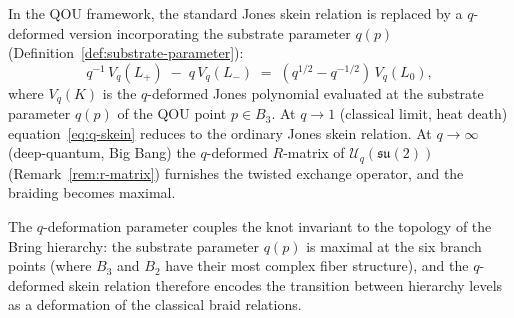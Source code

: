 \begin{remark}
\label{rem:q-deformed-skein}
In the QOU framework, the standard Jones skein relation is replaced by
a $q$-deformed version incorporating the substrate parameter
$q(p)$ (Definition~\ref{def:substrate-parameter}):
\begin{equation}\label{eq:q-skein}
  q^{-1}\,V_q(L_+) \;-\; q\,V_q(L_-) \;=\;
  (q^{1/2}-q^{-1/2})\,V_q(L_0),
\end{equation}
where $V_q(K)$ is the $q$-deformed Jones polynomial evaluated at the
substrate parameter $q(p)$ of the QOU point $p \in B_3$.  At
$q\to 1$ (classical limit, heat death) equation~\eqref{eq:q-skein}
reduces to the ordinary Jones skein relation.  At $q\to\infty$
(deep-quantum, Big Bang) the $q$-deformed $R$-matrix of
$\mathcal{U}_q(\mathfrak{su}(2))$
(Remark~\ref{rem:r-matrix}) furnishes the twisted exchange operator,
and the braiding becomes maximal.

\medskip\noindent
The $q$-deformation parameter couples the knot invariant to the
topology of the Bring hierarchy: the substrate parameter $q(p)$ is
maximal at the six branch points (where $B_3$ and $B_2$ have their
most complex fiber structure), and the $q$-deformed skein relation
therefore encodes the transition between hierarchy levels as a
deformation of the classical braid relations.
\end{remark}
